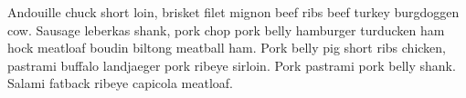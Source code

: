 
Andouille chuck short loin, brisket filet mignon beef ribs beef turkey burgdoggen cow. Sausage
leberkas shank, pork chop pork belly hamburger turducken ham hock meatloaf boudin biltong meatball
ham. Pork belly pig short ribs chicken, pastrami buffalo landjaeger pork ribeye sirloin. Pork
pastrami pork belly shank. Salami fatback ribeye capicola meatloaf.